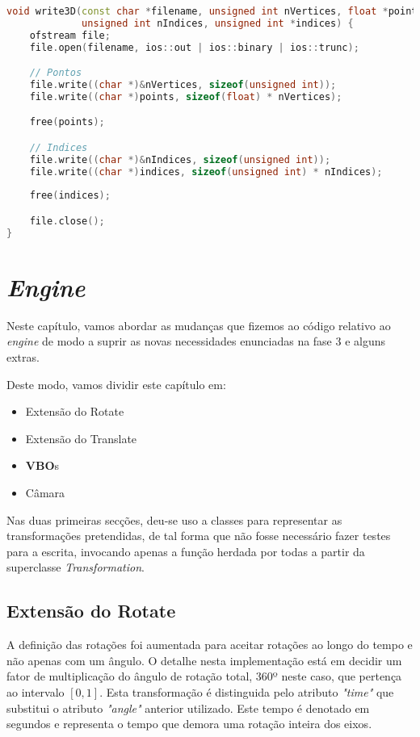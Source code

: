 \documentclass[14pt, a4 paper]{report}
\begin{document}
\begin{lstlisting}[language=c++]
void write3D(const char *filename, unsigned int nVertices, float *points,
             unsigned int nIndices, unsigned int *indices) {
    ofstream file;
    file.open(filename, ios::out | ios::binary | ios::trunc);

    // Pontos
    file.write((char *)&nVertices, sizeof(unsigned int));
    file.write((char *)points, sizeof(float) * nVertices);

    free(points);

    // Indices
    file.write((char *)&nIndices, sizeof(unsigned int));
    file.write((char *)indices, sizeof(unsigned int) * nIndices);
    
    free(indices);

    file.close();
}
\end{lstlisting}

\chapter{\textit{Engine}} \label{chap:engine}

Neste capítulo, vamos abordar as mudanças que fizemos ao código relativo ao \textit{engine} de modo a suprir as novas necessidades enunciadas na fase 3 e alguns extras.

Deste modo, vamos dividir este capítulo em:

\begin{itemize}
    \item Extensão do Rotate
    \item Extensão do Translate
    \item \textbf{VBO}s
    \item Câmara
\end{itemize}

Nas duas primeiras secções, deu-se uso a classes para representar as transformações pretendidas, de tal forma que não fosse necessário fazer testes para a escrita, invocando apenas a função herdada por todas a partir da superclasse \textit{Transformation}.

\section{Extensão do Rotate}

A definição das rotações foi aumentada para aceitar rotações ao longo do tempo e não apenas com um ângulo. O detalhe nesta implementação está em decidir um fator de multiplicação do ângulo de rotação total, 360º neste caso, que pertença ao intervalo $[0,1]$. Esta transformação é distinguida pelo atributo \textit{"time"} que substitui o atributo \textit{"angle"} anterior utilizado. Este tempo é denotado em segundos e representa o tempo que demora uma rotação inteira dos eixos.
\end{document}
